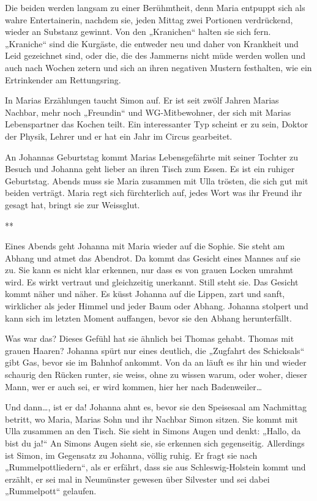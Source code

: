 \documentclass[10pt,titlepage,a5paper]{book}
\newcommand{\sterne}{\par{\centering ***\par}}
\begin{document}
Die beiden werden langsam zu einer Berühmtheit, denn Maria entpuppt sich als wahre Entertainerin, nachdem sie, jeden Mittag zwei Portionen verdrückend, wieder an Substanz gewinnt. Von den „Kranichen“ halten sie sich fern. „Kraniche“ sind die Kurgäste, die entweder neu und daher von Krankheit und Leid gezeichnet sind, oder die, die des Jammerns nicht müde werden wollen und auch nach Wochen zetern und sich an ihren negativen Mustern festhalten, wie ein Ertrinkender am Rettungsring.

In Marias Erzählungen taucht Simon auf. Er ist seit zwölf Jahren Marias Nachbar, mehr noch „Freundin“ und WG-Mitbewohner, der sich mit Marias Lebenspartner das Kochen teilt. Ein interessanter Typ scheint er zu sein, Doktor der Physik, Lehrer und er hat ein Jahr im Circus gearbeitet.

An Johannas Geburtstag kommt Marias Lebensgefährte mit seiner Tochter zu Besuch und Johanna geht lieber an ihren Tisch zum Essen. Es ist ein ruhiger Geburtstag. Abends muss sie Maria zusammen mit Ulla trösten, die sich gut mit beiden verträgt. Maria regt sich fürchterlich auf, jedes Wort was ihr Freund ihr gesagt hat, bringt sie zur Weissglut.

\sterne

Eines Abends geht Johanna mit Maria wieder auf die Sophie. Sie steht am Abhang und atmet das Abendrot. Da kommt das Gesicht eines Mannes auf sie zu. Sie kann es nicht klar erkennen, nur dass es von grauen Locken umrahmt wird. Es wirkt vertraut und gleichzeitig unerkannt. Still steht sie. Das Gesicht kommt  näher und näher. Es küsst Johanna auf die Lippen, zart und sanft, wirklicher als jeder Himmel und jeder Baum oder Abhang. Johanna stolpert und kann sich im letzten Moment auffangen, bevor sie den Abhang herunterfällt.

Was war das? Dieses Gefühl hat sie ähnlich bei Thomas gehabt. Thomas mit grauen Haaren? Johanna spürt nur eines deutlich, die „Zugfahrt des Schicksals“ gibt Gas, bevor sie im Bahnhof ankommt. Von da an läuft es ihr hin und wieder schaurig den Rücken runter, sie weiss, ohne zu wissen warum, oder woher, dieser Mann, wer er auch sei, er wird kommen, hier her nach Badenweiler\dots 

Und dann\dots , ist er da! Johanna ahnt es, bevor sie den Speisesaal am Nachmittag betritt, wo Maria, Marias Sohn und ihr Nachbar Simon sitzen. Sie kommt mit Ulla zusammen an den Tisch. Sie sieht in Simons Augen und denkt: „Hallo, da bist du ja!“ An Simons Augen sieht sie, sie erkennen sich gegenseitig. Allerdings ist Simon, im Gegensatz zu Johanna, völlig ruhig. Er fragt sie nach „Rummelpottliedern“, als er erfährt, dass sie aus Schleswig-Holstein kommt und erzählt, er sei mal in Neumünster gewesen über Silvester und sei dabei „Rummelpott“ gelaufen.
\end{document}
